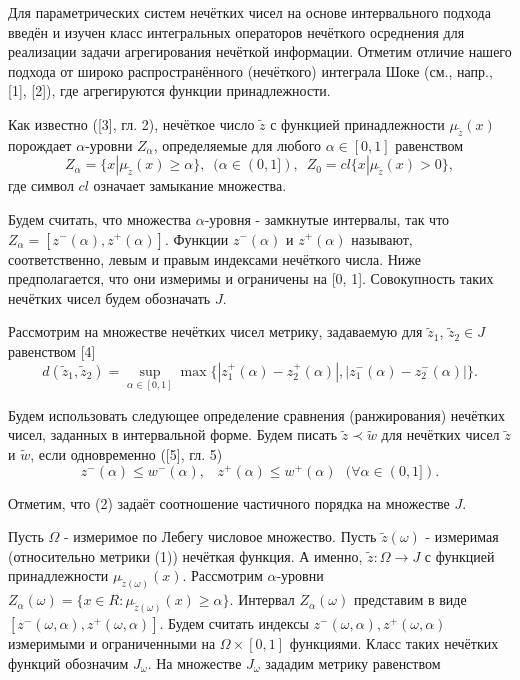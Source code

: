 
\vzmscaption


Для параметрических систем нечётких чисел на основе интервального подхода введён и изучен класс интегральных операторов нечёткого осреднения для реализации задачи агрегирования нечёткой информации.  Отметим отличие нашего подхода от  широко распространённого (нечёткого) интеграла Шоке (см., напр., [1], [2]), где агрегируются функции принадлежности.

Как известно ([3], гл. 2), нечёткое число $\tilde{z}$ с функцией принадлежности $\mu_{\tilde{z}}(x)$ порождает $\alpha$-уровни $Z_{\alpha}$, определяемые для любого $\alpha\in [0, 1]$ равенством
$$
Z_{\alpha}  = \{x| \mu_{\tilde{z}}(x)\geq \alpha\},\,\,\,(\alpha\in(0, 1]),\,\,\,Z_0 = cl\{x| \mu_{\tilde{z}}(x)>0\},
$$
где символ $cl$ означает замыкание множества.

Будем считать, что  множества $\alpha$-уровня - замкнутые интервалы, так что $Z_{\alpha} = [z^{-}(\alpha), z^{+}(\alpha)]$. Функции $z^{-}(\alpha)$ и $z^{+}(\alpha)$ называют, соответственно, левым и правым индексами нечёткого числа. Ниже предполагается, что они измеримы и ограничены на [0, 1]. Совокупность таких нечётких чисел будем обозначать $J$.

Рассмотрим на множестве нечётких чисел метрику, задаваемую для $\tilde{z}_1$, $\tilde{z}_2\in J$ равенством [4]
\begin{equation}
d(\tilde{z}_1, \tilde{z}_2) = \sup\limits_{\alpha\in[0,1]}\max\{|z_1^{+}(\alpha) - z_2^{+}(\alpha)|, |z_1^{-}(\alpha) - z_2^{-}( \alpha)|\}.
\end{equation}

Будем использовать следующее определение сравнения (ранжирования) нечётких чисел, заданных в интервальной форме. Будем писать $\tilde{z}\prec\tilde{w}$ для нечётких чисел $\tilde{z}$ и $\tilde{w}$, если одновременно ([5], гл. 5)
\begin{equation}
z^{-}(\alpha)\leq w^{-}(\alpha), \,\,\,\,\,z^{+}(\alpha)\leq w^{+}(\alpha)\,\,\,\,(\forall\alpha\in (0,1]).
\end{equation}

Отметим, что (2) задаёт соотношение частичного порядка на множестве $J$.

Пусть $\Omega$ - измеримое по Лебегу числовое множество.   Пусть $\tilde{z}(\omega)$ - измеримая
(относительно метрики (1))  нечёткая функция. А именно, $\tilde{z}: \Omega \rightarrow J$ с функцией принадлежности $\mu_{\tilde{z}(\omega)}(x)$. Рассмотрим $\alpha$-уровни $Z_{\alpha}(\omega) = \{x\in R: \mu_{\tilde{z}(\omega)}(x)\geq \alpha\}$. Интервал $Z_{\alpha}(\omega)$ представим в виде $[z^{-}(\omega, \alpha), z^{+}(\omega, \alpha)]$. Будем считать индексы $z^{-}(\omega, \alpha), z^{+}(\omega, \alpha)$ измеримыми и ограниченными на $\Omega\times[0,1]$ функциями. Класс таких нечётких функций обозначим $J_{\omega}$. На множестве $J_{\omega}$ зададим метрику равенством


